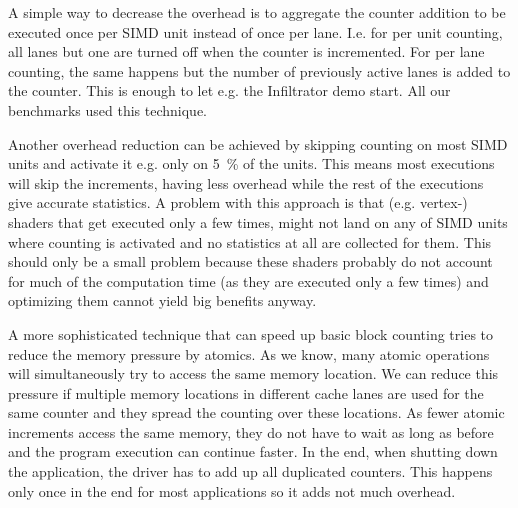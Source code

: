 A simple way to decrease the overhead is to aggregate the counter addition to be executed once per SIMD unit instead of once per lane.
I.e. for per unit counting, all lanes but one are turned off when the counter is incremented.
For per lane counting, the same happens but the number of previously active lanes is added to the counter.
This is enough to let e.g. the Infiltrator demo start.
All our benchmarks used this technique.

Another overhead reduction can be achieved by skipping counting on most SIMD units and activate it e.g. only on \SI{5}{\percent} of the units.
This means most executions will skip the increments, having less overhead while the rest of the executions give accurate statistics.
A problem with this approach is that (e.g. vertex-) shaders that get executed only a few times, might not land on any of SIMD units where counting is activated and no statistics at all are collected for them.
This should only be a small problem because these shaders probably do not account for much of the computation time (as they are executed only a few times) and optimizing them cannot yield big benefits anyway.

A more sophisticated technique that can speed up basic block counting tries to reduce the memory pressure by atomics.
As we know, many atomic operations will simultaneously try to access the same memory location.
We can reduce this pressure if multiple memory locations in different cache lanes are used for the same counter and they spread the counting over these locations.
As fewer atomic increments access the same memory, they do not have to wait as long as before and the program execution can continue faster.
In the end, when shutting down the application, the driver has to add up all duplicated counters.
This happens only once in the end for most applications so it adds not much overhead.
